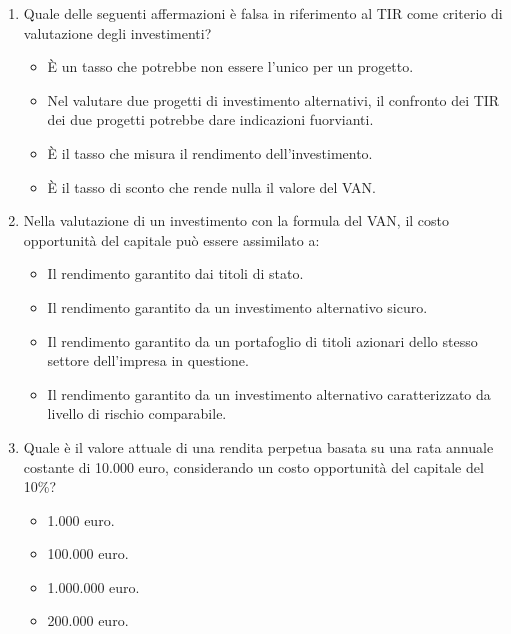 \documentclass{article}
\begin{document}
\begin{enumerate}
    \item Quale delle seguenti affermazioni è falsa in riferimento al TIR come criterio di valutazione degli investimenti?
          \begin{itemize}
              \item[\sout{A.}] È un tasso che potrebbe non essere l'unico per un progetto.
              \item[\sout{B.}] Nel valutare due progetti di investimento alternativi, il confronto dei TIR dei due progetti potrebbe dare indicazioni fuorvianti.
              \item[\checkmark] È il tasso che misura il rendimento dell'investimento.
              \item[\sout{C.}] È il tasso di sconto che rende nulla il valore del VAN.
          \end{itemize}

    \item Nella valutazione di un investimento con la formula del VAN, il costo opportunità del capitale può essere assimilato a:
          \begin{itemize}
              \item[\sout{A.}] Il rendimento garantito dai titoli di stato.
              \item[\sout{B.}] Il rendimento garantito da un investimento alternativo sicuro.
              \item[\sout{C.}] Il rendimento garantito da un portafoglio di titoli azionari dello stesso settore dell'impresa in questione.
              \item[\checkmark] Il rendimento garantito da un investimento alternativo caratterizzato da livello di rischio comparabile.
          \end{itemize}
    \item Quale è il valore attuale di una rendita perpetua basata su una rata annuale costante di 10.000 euro, considerando un costo opportunità del capitale del 10\%?
          \begin{itemize}
              \item[\sout{A.}] 1.000 euro.
              \item[\checkmark] 100.000 euro.
              \item[\sout{B.}] 1.000.000 euro.
              \item[\sout{C.}] 200.000 euro.
          \end{itemize}


\end{enumerate}
\end{document}
